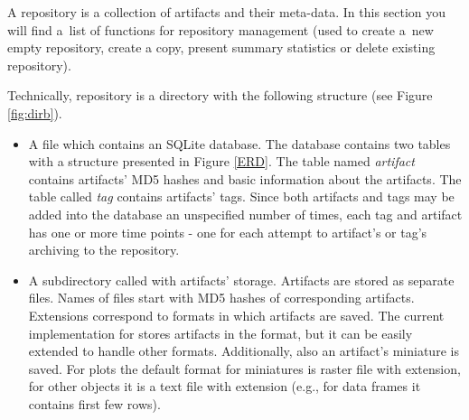 \documentclass[nojss]{jss}\usepackage[]{graphicx}\usepackage[]{color}
\begin{document}
A repository is a collection of artifacts and their meta-data. In this section you will find a~list of functions for repository management (used to create a~new empty repository, create a copy, present summary statistics or delete existing repository).

Technically, repository is a directory with the following structure (see Figure \ref{fig:dirb}).
\begin{itemize}
\item A  file which contains an SQLite database. The database contains two tables with a structure presented in Figure \ref{ERD}. The table named \textit{artifact} contains artifacts’ MD5 hashes and basic information about the artifacts. The table called \textit{tag} contains artifacts’ tags. Since both artifacts and tags may be added into the database an unspecified number of times, each tag and artifact has one or more time points - one for each attempt to artifact's or tag's archiving to the repository.
\item A subdirectory called  with artifacts' storage. Artifacts are stored as separate files.  {Names of files start with MD5 hashes of corresponding artifacts. Extensions correspond to formats in which artifacts are saved. The current implementation for  stores artifacts in the  format, but it can be easily extended to handle other formats. Additionally, also an artifact’s miniature is saved.} 
For plots the default format for miniatures is raster file with   extension, for other objects it is a text file with  extension (e.g., for data frames it contains first few rows).
\end{itemize}
\end{document}
